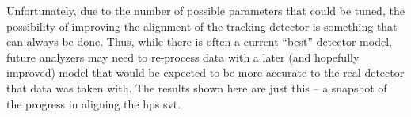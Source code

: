 Unfortunately, due to the number of possible parameters that could be tuned,
the possibility of improving the alignment of the tracking detector is something
that can always be done.
Thus, while there is often a current ``best'' detector model, future analyzers
may need to re-process data with a later (and hopefully improved) model that
would be expected to be more accurate to the real detector that data was taken with.
The results shown here are just this -- a snapshot of the progress in aligning the
\ac{hps} \ac{svt}.

